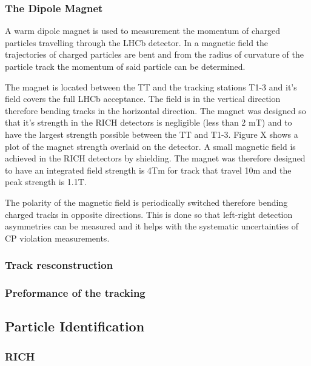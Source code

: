 \subsubsection{The Dipole Magnet}
A warm dipole magnet is used to measurement the momentum of charged particles travelling through the LHCb detector. In a magnetic field the trajectories of charged particles are bent and from the radius of curvature of the particle track the momentum of said particle can be determined.

The magnet is located between the TT and the tracking stations T1-3 and it’s field covers the full LHCb acceptance. The field is in the vertical direction therefore bending tracks in the horizontal direction. The magnet was designed so that it’s strength in the RICH detectors is negligible (less than 2 mT) and to have the largest strength possible between the TT and T1-3. Figure X shows a plot of the magnet strength overlaid on the detector. A small magnetic field is achieved in the RICH detectors by shielding. The magnet was therefore designed to have an integrated field strength is 4Tm for track that travel 10m and the peak strength is 1.1T. %

The polarity of the magnetic field is periodically switched therefore bending charged tracks in opposite directions. This is done so that left-right detection asymmetries can be measured and it helps with the systematic uncertainties of CP violation measurements. %

\subsubsection{Track resconstruction}
\subsubsection{Preformance of the tracking}





\subsection{Particle Identification}
\subsubsection{RICH}
